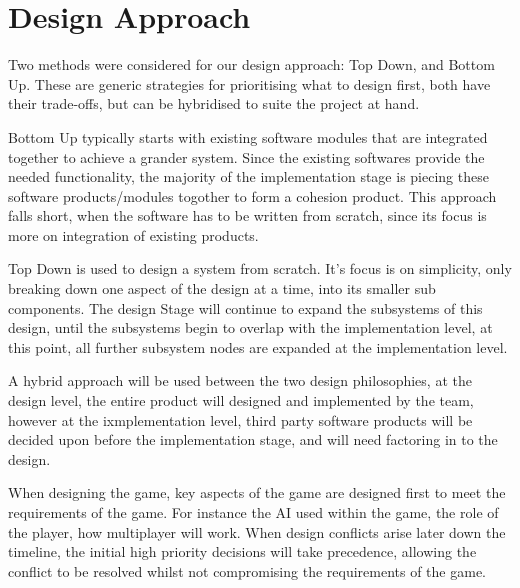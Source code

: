 \section{Design Approach}


Two methods were considered for our design approach: Top Down, and Bottom Up.
These are generic strategies for prioritising what to design first, both have their trade-offs, but can be hybridised to suite the project at hand.

Bottom Up typically starts with existing software modules that are integrated together to achieve a grander system.
Since the existing softwares provide the needed functionality, the majority of the implementation stage is piecing these software products/modules togother to form a cohesion product.
This approach falls short, when the software has to be written from scratch, since its focus is more on integration of existing products.

Top Down is used to design a system from scratch.
It's focus is on simplicity, only breaking down one aspect of the design at a time, into its smaller sub components.
The design Stage will continue to expand the subsystems of this design, until the subsystems begin to overlap with the implementation level, at this point, all further subsystem nodes are expanded at the implementation level.

A hybrid approach will be used between the two design philosophies, at the design level, the  entire product will designed and implemented by the team, however at the ixmplementation level, third party software products will be decided upon before the implementation stage, and will need factoring in to the design.

When designing the game, key aspects of the game are designed first to meet the requirements of the game. For instance the AI used within the game, the role of the player, how multiplayer will work.
When design conflicts arise later down the timeline, the initial high priority decisions will take precedence, allowing the conflict to be resolved whilst not compromising the requirements of the game.

